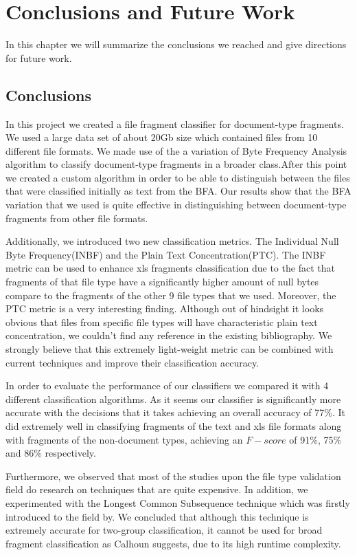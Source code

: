 \chapter{Conclusions and Future Work}
In this chapter we will summarize the conclusions we reached and give directions for future work.

\section{Conclusions}
In this project we created a file fragment classifier for document-type fragments. We used a large data set of about 20Gb size which contained files from 10 different file formats. We made use of the a variation of Byte Frequency Analysis algorithm to classify document-type fragments in a broader class.After this point we created a custom algorithm in order to be able to distinguish between the files that were classified initially as text from the BFA. Our results show that the BFA variation that we used is quite effective in distinguishing between document-type fragments from other file formats. 

Additionally, we introduced two new classification metrics. The Individual Null Byte Frequency(INBF) and the Plain Text Concentration(PTC). The INBF metric can be used to enhance xls fragments classification due to the fact that fragments of that file type have a significantly higher amount of null bytes compare to the fragments of the other 9 file types that we used. Moreover, the PTC metric is a very interesting finding. Although out of hindsight it looks obvious that files from specific file types will have characteristic plain text concentration, we couldn't find any reference in the existing bibliography. We strongly believe that this extremely light-weight metric can be combined with current techniques and improve their classification accuracy. 

In order to evaluate the performance of our classifiers we compared it with 4 different classification algorithms. As it seems our classifier is significantly more accurate with the decisions that it takes achieving an overall accuracy of 77\%. It did extremely well in classifying fragments of the text and xls file formats along with fragments of the non-document types, achieving an $F-score$ of 91\%, 75\% and 86\% respectively. 

Furthermore, we observed that most of the studies upon the file type validation field do research on techniques that are quite expensive. In addition, we experimented with the Longest Common Subsequence technique which was firstly introduced to the field by\cite{Calhoun}. We concluded that although this technique is extremely accurate for two-group classification, it cannot be used for broad fragment classification as Calhoun suggests, due to its high runtime complexity.

